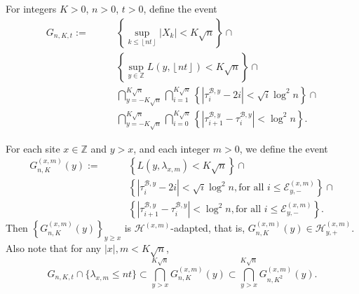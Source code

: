 \documentclass[twoside,12pt,a4paper]{article}
\numberwithin{equation}{section}
\newcommand{\abs}[1]{\left\vert #1 \right\vert}
\begin{document}
	For integers $K>0$, $n > 0$, $t>0$, define the event
	\begin{align}
		G_{n,K,t} :=  \qquad
		\label{eqn:good-event-1}
		& \left\{\sup _{k \le \left\lfloor nt  \right\rfloor} |X_k| < K \sqrt{n} \right\} \cap \\
		\label{eqn:good-event-2}
		& \left\{\sup_{y \in \mathbb{Z}} L(y, \left\lfloor nt  \right\rfloor) < K \sqrt{n} \right\} \cap \\
		\label{eqn:good-event-3}
		& \bigcap_{y = - K \sqrt{n} }^{K \sqrt{n}} 
		\bigcap_{i = 1}^{K \sqrt{n} } \left\{\left| \tau_i^{\mathcal{B},y} - 2 i \right| < \sqrt{ i } \log^2 n \right\}  \cap \\
		\label{eqn:good-event-4}
		& \bigcap_{y = - K \sqrt{n} }^{K \sqrt{n}} 
		\bigcap_{i = 0}^{K \sqrt{n} } \left\{\left| \tau_{i+1}^{\mathcal{B},y} - \tau_i^{\mathcal{B},y} \right| < \log^2 n \right\}  
		.\end{align}
	
	For each site $x \in \mathbb{Z}$ and $y > x$, and each integer $m > 0$, we define the event
	\begin{align}
		G_{n,K}^{(x,m)}(y) :=  \qquad
		& \left\{L(y,\lambda_{x,m})  < K \sqrt{n} \right\} \cap \\
		& \left\{\left| \tau_i^{\mathcal{B}, y} - 2 i \right| < \sqrt{ i } \log^2 n, \mbox{for all $i\leq  \mathcal{E}_{y,-}^{(x,m)}$} \right\}  \cap \\
		& \left\{\left| \tau_{i+1}^{\mathcal{B},y} - \tau_i^{\mathcal{B},y} \right| < \log^2 n,  \mbox{for all $i\leq  \mathcal{E}_{y,-}^{(x,m)}$}  \right\}  
		.\end{align}
	Then  $\left\{G_{n, K}^{(x,m)}(y)\right\}_{y \ge x}$ is $\mathcal{H}^{(x,m)}$-adapted, that is, $G_{n, K}^{(x,m)}(y)\in \mathcal{H}_{y, +}^{(x,m)}$.
	Also note that for any $ \abs{x},m < K\sqrt{n}$, 
	\begin{equation}
		\label{eqn:goodgood}
		G_{n, K, t}\cap \{ \lambda_{x,m} \leq nt \} \subset   \bigcap_{y>x}^{K\sqrt{n}} G_{n, K}^{(x,m)}(y) \subset   \bigcap_{y>x}^{K\sqrt{n}} G_{n, K^2}^{(x,m)}(y)
		.\end{equation} 
	
\end{document}
